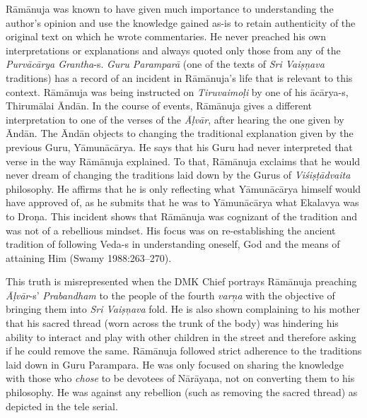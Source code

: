 Rāmānuja was known to have given much importance to understanding the author’s opinion and use the knowledge gained as-is to retain authenticity of the original text on which he wrote commentaries. He never preached his own interpretations or explanations and always quoted only those from any of the \textit{Purvācārya Grantha}-s. \textit{Guru Paramparā} (one of the texts of \textit{Sri Vaiṣņava} traditions) has a record of an incident in Rāmānuja’s life that is relevant to this context. Rāmānuja was being instructed on \textit{Tiruvaimoḷi }by one of his ācārya-s, Thirumālai Āndān. In the course of events, Rāmānuja gives a different interpretation to one of the verses of the \textit{Āḷvār}, after hearing the one given by Āndān. The Āndān objects to changing the traditional explanation given by the previous Guru, Yāmunācārya. He says that his Guru had never interpreted that verse in the way Rāmānuja explained. To that, Rāmānuja exclaims that he would never dream of changing the traditions laid down by the Gurus of \textit{Viśiṣṭādvaita} philosophy. He affirms that he is only reflecting what Yāmunācārya himself would have approved of, as he submits that he was to Yāmunācārya what Ekalavya was to Droṇa. This incident shows that Rāmānuja was cognizant of the tradition and was not of a rebellious mindset. His focus was on re-establishing the ancient tradition of following Veda-s in understanding oneself, God and the means of attaining Him (Swamy 1988:263–270).

This truth is misrepresented when the DMK Chief portrays Rāmānuja preaching \textit{Āḷvār}-s’ \textit{Prabandham} to the people of the fourth\textit{ varņa} with the objective of bringing them into \textit{Sri Vaiṣņava} fold. He is also shown complaining to his mother that his sacred thread (worn across the trunk of the body) was hindering his ability to interact and play with other children in the street and therefore asking if he could remove the same. Rāmānuja followed strict adherence to the traditions laid down in Guru Parampara. He was only focused on sharing the knowledge with those who \textit{chose} to be devotees of Nārāyaṇa, not on converting them to his philosophy. He was against any rebellion (such as removing the sacred thread) as depicted in the tele serial.

\newpage


